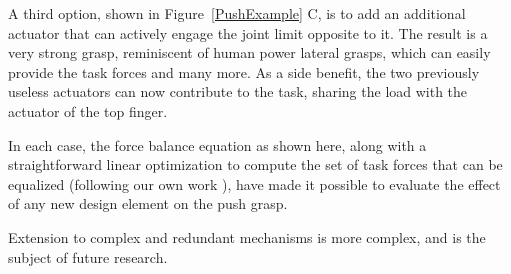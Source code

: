 A third option, shown in Figure~\ref{PushExample} C, is to add an additional actuator that can actively engage the joint limit opposite to it.   The result is a very strong grasp, reminiscent of human power lateral grasps, which can easily provide the task forces and many more.   As a side benefit, the two previously useless actuators can now contribute to the task, sharing the load with the actuator of the top finger.

In each case, the force balance equation as shown here, along with a straightforward linear optimization to compute the set of task forces that can be equalized (following our own work \cite{Li:graspDB07}), have made it possible to evaluate the effect of any new design element on the push grasp.

Extension to complex and redundant mechanisms is more complex, and is the subject of future research.


